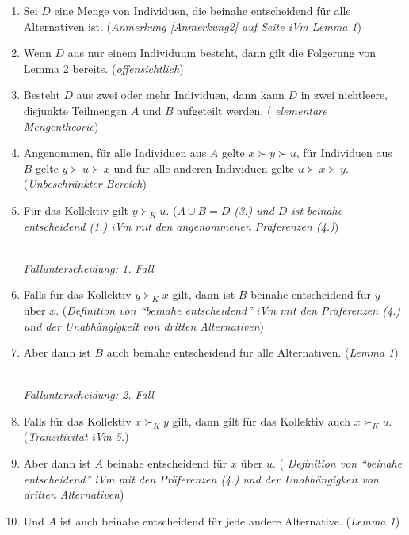 \begin{enumerate}
  \item Sei $D$ eine Menge von Individuen, die beinahe entscheidend für alle
  Alternativen ist. ({\em Anmerkung \ref{Anmerkung2} auf Seite
    \pageref{Anmerkung2} iVm Lemma 1})
  
  \item Wenn $D$ aus nur einem Individuum besteht, dann gilt die Folgerung von
  Lemma 2 bereits. ({\em offensichtlich})
  
  \item Besteht $D$ aus zwei oder mehr Individuen, dann kann $D$ in zwei
  nichtleere, disjunkte Teilmengen $A$ und $B$ aufgeteilt werden. ({\em
  elementare Mengentheorie})
  
  \item Angenommen, für alle Individuen aus $A$ gelte $x \succ y \succ u$, für
  Individuen aus $B$ gelte $y \succ u \succ x$ und für alle anderen Individuen
  gelte $u \succ x \succ y$. ({\em Unbeschränkter Bereich})
  
  \item Für das Kollektiv gilt $y \succ_K u$. ({\em $A \cup B = D$ (3.) und $D$
  ist beinahe entscheidend (1.) iVm mit den angenommenen Präferenzen (4.)})
  
  ~\\{\em Fallunterscheidung: 1. Fall}
  
  \item Falls für das Kollektiv $y \succ_K x$ gilt, dann ist $B$
  beinahe entscheidend für $y$ über $x$. ({\em Definition von "`beinahe
  entscheidend"' iVm mit den Präferenzen (4.) und der Unabhängigkeit von
  dritten Alternativen})
  
  \item Aber dann ist $B$ auch beinahe entscheidend für alle Alternativen.
  ({\em Lemma 1})
  
  ~\\{\em Fallunterscheidung: 2. Fall}
   
  \item Falls für das Kollektiv $x \succ_K y$ gilt, dann gilt für das Kollektiv
  auch $x \succ_K u$. ({\em Transitivität iVm 5.})
  
  \item Aber dann ist $A$ beinahe entscheidend für $x$ über $u$. ({\em
  Definition von "`beinahe entscheidend"' iVm mit den Präferenzen (4.) und der
  Unabhängigkeit von dritten Alternativen})

  \item Und $A$ ist auch beinahe entscheidend für jede andere Alternative.
  ({\em Lemma 1})


\end{enumerate}
